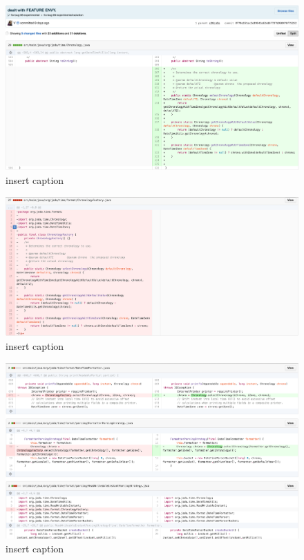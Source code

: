 \begin{figure}[H]
	\centering
	\includegraphics[width=\linewidth]{code122}
	\caption{insert caption}
\end{figure}
\begin{figure}[H]
	\centering
	\includegraphics[width=\linewidth]{code123}
	\caption{insert caption}
\end{figure}
\begin{figure}[H]
	\centering
	\includegraphics[width=\linewidth]{code124}
	\caption{insert caption}
\end{figure}


